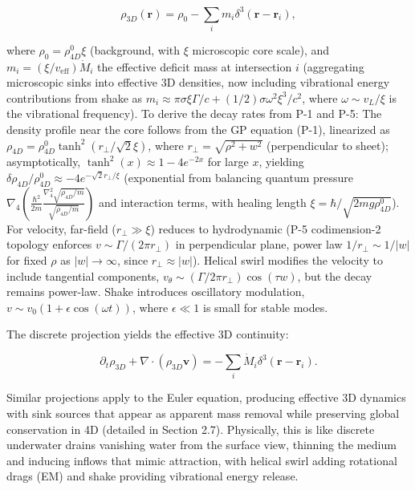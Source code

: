 \[
\rho_{3D}(\mathbf{r}) = \rho_0 - \sum_i m_i \delta^3(\mathbf{r} - \mathbf{r}_i),
\]

where $\rho_0 = \rho_{4D}^0 \xi$ (background, with $\xi$ microscopic core scale), and $m_i = (\xi / v_{\text{eff}}) \dot{M}_i$ the effective deficit mass at intersection $i$ (aggregating microscopic sinks into effective 3D densities, now including vibrational energy contributions from shake as $m_i \approx \pi \sigma \xi \Gamma / c + (1/2) \sigma \omega^2 \xi^3 / c^2$, where $\omega \sim v_L / \xi$ is the vibrational frequency). To derive the decay rates from P-1 and P-5: The density profile near the core follows from the GP equation (P-1), linearized as $\rho_{4D} = \rho_{4D}^0 \tanh^2 (r_\perp / \sqrt{2} \xi)$, where $r_\perp = \sqrt{\rho^2 + w^2}$ (perpendicular to sheet); asymptotically, $\tanh^2(x) \approx 1 - 4 e^{-2x}$ for large $x$, yielding $\delta \rho_{4D} / \rho_{4D}^0 \approx -4 e^{-\sqrt{2} r_\perp / \xi}$ (exponential from balancing quantum pressure $\nabla_4 \left( \frac{\hbar^2}{2 m} \frac{\nabla_4^2 \sqrt{\rho_{4D}/m}}{\sqrt{\rho_{4D}/m}} \right)$ and interaction terms, with healing length $\xi = \hbar / \sqrt{2 m g \rho_{4D}^0}$). For velocity, far-field ($r_\perp \gg \xi$) reduces to hydrodynamic (P-5 codimension-2 topology enforces $v \sim \Gamma / (2\pi r_\perp)$ in perpendicular plane, power law $1/r_\perp \sim 1/|w|$ for fixed $\rho$ as $|w| \to \infty$, since $r_\perp \approx |w|$). Helical swirl modifies the velocity to include tangential components, $v_\theta \sim (\Gamma / 2\pi r_\perp) \cos(\tau w)$, but the decay remains power-law. Shake introduces oscillatory modulation, $v \sim v_0 (1 + \epsilon \cos(\omega t))$, where $\epsilon \ll 1$ is small for stable modes.

The discrete projection yields the effective 3D continuity:

\[
\partial_t \rho_{3D} + \nabla \cdot (\rho_{3D} \mathbf{v}) = -\sum_i \dot{M}_i \delta^3(\mathbf{r} - \mathbf{r}_i).
\]

Similar projections apply to the Euler equation, producing effective 3D dynamics with sink sources that appear as apparent mass removal while preserving global conservation in 4D (detailed in Section 2.7). Physically, this is like discrete underwater drains vanishing water from the surface view, thinning the medium and inducing inflows that mimic attraction, with helical swirl adding rotational drags (EM) and shake providing vibrational energy release.

